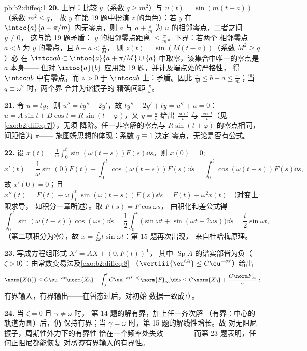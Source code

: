 \begin{solution}{pb:b2:diffeq:1}
\textbf{20.} 上界：比较 $y$（系数 $q \geq
m^2$）与 $u(t) = \sin(m(t - a))$（系数 $m^2 \leq q$，
故 $y$ 在第 19 题中扮演 $z$ 的角色）：若 $y$
在 $\intoc{a}{a + \pi/m}$ 内无零点，则 $a$ 与 $a +
\frac\pi m$ 为 $u$ 的相邻零点，二者之间 $y \neq 0$，
这与第 19 题矛盾：
$y$ 的相邻零点距离 $\leq \frac\pi m$。下界：若两个
相邻零点 $a < b$ 为 $y$ 的零点，且 $b - a < \frac\pi M$，
则 $z(t) = \sin(M(t-a))$（系数 $M^2 \geq q$）必
在 $\intcc ab \subset \intoo{a}{a + \pi/M}
\cup\{a\}$ 中取零，该集合中唯一的零点是 $a$ 本身——
但对 $\intoo{a}{b}$ 应用第 19 题，并计及端点处的严格性，
得 $\intcc ab$ 中有零点，而 $z > 0$ 于
$\intoc ab$ 上：矛盾。因此 $\frac\pi M \leq b - a \leq
\frac\pi m$；当 $q \equiv \omega^2$ 时，两个界
合并为谐振子的
精确间距 $\frac\pi\omega$。

\textbf{21.} 令 $u = ty$，则 $u'' = ty'' + 2y'$，故 $ty'' + 2y'
+ ty = u'' + u = 0$：$u = A\sin t + B\cos t = R\sin(t +
\varphi)$，又 $y = \frac{u}{t}$ 给出 $\frac{\sin t}t$ 与
$\frac{\cos t}t$（见\cref{exo:b2:diffeq:7}），无须
降阶。任一非零解的零点与
$R\sin(t + \varphi)$ 的零点相同，间距恰为 $\pi$——
施图姆思想的体现：系数 $q \equiv 1$ 决定
零点，无论是否有公式。

\textbf{22.} 设 $x(t) =
\frac1\omega\int_0^t\sin(\omega(t-s))F(s)\dd s$。则 $x(0) =
0$;
\[
x'(t) = \frac1\omega\sin(0)F(t) +
\int_0^t\cos(\omega(t-s))F(s)\dd s
= \int_0^t\cos(\omega(t-s))F(s)\dd s ,
\]
故 $x'(0) = 0$；且 $x''(t) = F(t) -
\omega\int_0^t\sin(\omega(t-s))F(s)\dd s = F(t) - \omega^2x(t)$
（对变上限求导，
如积分一章所述）。取 $F(s) = F\cos\omega s$，
由积化和差公式得
\[
\int_0^t\sin(\omega(t-s))\cos(\omega s)\dd s
= \frac12\int_0^t\bigl(\sin\omega t + \sin(\omega t -
2\omega s)\bigr)\dd s
= \frac{t}{2}\sin\omega t ,
\]
（第二项积分为零），故 $x =
\frac{F}{2\omega}t\sin\omega t$：第 15 题再次出现，
来自杜哈梅原理。

\textbf{23.} 写成方程组形式 $X' = AX + (0, F(t))^{\mathsf T}$，
其中 $\operatorname{Sp}A$ 的谱实部皆为负（$\zeta >
0$）：由常数变易法及\cref{exo:b2:diffeq:8}
（$\vertiii{\eu^{tA}} \leq C\eu^{-\alpha t}$）给出
\[
\norm{X(t)} \leq C\eu^{-\alpha t}\norm{X_0}
+ \int_0^t C\eu^{-\alpha(t-s)}\norm{F}_\infty\dd s
\leq C\norm{X_0} + \frac{C\norm F_\infty}{\alpha} :
\]
有界输入，有界输出——在暂态过后，对初始
数据一致成立。

\textbf{24.} 当 $\zeta = 0$ 且 $\gamma \neq \omega$ 时，
第 14 题的解有界，加上任一齐次解
（有界：中心的轨道为圆）后，仍
保持有界；当 $\gamma = \omega$ 时，第 15 题的解线性增长。故
对无阻尼振子，周期性外力下的有界性
恰在一个频率处失效————
而第 23 题表明，任何正阻尼都能恢复
对\emph{所有}有界输入的有界性。


\end{solution}
